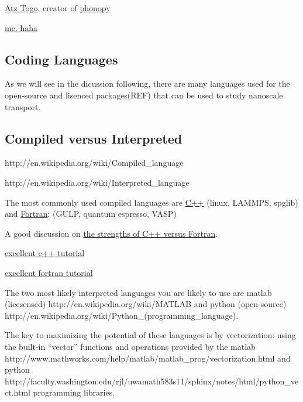 \href{http://atztogo.users.sourceforge.net/}{Atz Togo}, creator of 
\href{http://phonopy.sourceforge.net/}{phonopy}

\href{http://jasonlarkin.github.io}{me, haha}


\subsection{Coding Languages}

As we will see in the dicussion following, there are many languages 
used for the open-source and lisenced packages(REF) that can be used 
to study nanoscale transport.
\subsection{Compiled versus Interpreted}

http://en.wikipedia.org/wiki/Compiled_language

http://en.wikipedia.org/wiki/Interpreted_language

The most commonly used compiled languages are 
\href{https://en.wikipedia.org/wiki/C\%2B\%2B}{C++} 
(linux, LAMMPS, spglib) 
and 
\href{http://en.wikipedia.org/wiki/Fortran}{Fortran}: 
(GULP, quantum espresso, VASP)

A good discussion on 
\href{http://stackoverflow.com/questions/13078736/fortran-vs-c-does-fortran-still-hold-any-advantage-in-numerical-analysis-thes}
{the strengths of C++ versus Fortran}.

\href{http://www.youtube.com/watch?v=XFQ9dw3CyDo&list=PL1D10C030FDCE7CE0}
{excellent c++ tutorial}

\href{http://www.youtube.com/watch?v=YRTEOFMUTzw&list=PL6A8E21D2E86A0155}
{excellent fortran tutorial}


The two most likely interpreted languages you are likely to use are 
matlab (licesensed) http://en.wikipedia.org/wiki/MATLAB 
and 
python (open-source) http://en.wikipedia.org/wiki/Python_(programming_language).



The key to maximizing the potential of these languages is by vectorization: 
using the built-in ``vector'' functions and operations provided by the 
matlab http://www.mathworks.com/help/matlab/matlab_prog/vectorization.html 
and 
python http://faculty.washington.edu/rjl/uwamath583s11/sphinx/notes/html/python_vect.html 
programming libraries.

